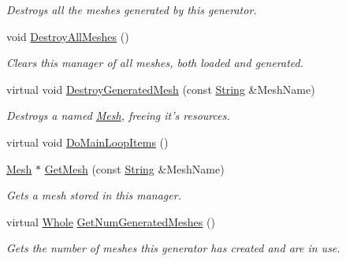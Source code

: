 \begin{DoxyCompactItemize}
\begin{DoxyCompactList}\small\item\em Destroys all the meshes generated by this generator. \item\end{DoxyCompactList}\item 
\hypertarget{classMezzanine_1_1MeshManager_aa807f17cbba66ff45f8ffd5d027dec7e}{
void \hyperlink{classMezzanine_1_1MeshManager_aa807f17cbba66ff45f8ffd5d027dec7e}{DestroyAllMeshes} ()}
\label{classMezzanine_1_1MeshManager_aa807f17cbba66ff45f8ffd5d027dec7e}

\begin{DoxyCompactList}\small\item\em Clears this manager of all meshes, both loaded and generated. \item\end{DoxyCompactList}\item 
virtual void \hyperlink{classMezzanine_1_1MeshManager_a9c9286c940e56c4ba6a02ef58bfc0374}{DestroyGeneratedMesh} (const \hyperlink{namespaceMezzanine_acf9fcc130e6ebf08e3d8491aebcf1c86}{String} \&MeshName)
\begin{DoxyCompactList}\small\item\em Destroys a named \hyperlink{classMezzanine_1_1Mesh}{Mesh}, freeing it's resources. \item\end{DoxyCompactList}\item 
virtual void \hyperlink{classMezzanine_1_1MeshManager_acfbea42e8aeb36d48522ad027f1e8764}{DoMainLoopItems} ()
\item 
\hyperlink{classMezzanine_1_1Mesh}{Mesh} $\ast$ \hyperlink{classMezzanine_1_1MeshManager_a9f564124032f9dc8a636f8092bbbc87e}{GetMesh} (const \hyperlink{namespaceMezzanine_acf9fcc130e6ebf08e3d8491aebcf1c86}{String} \&MeshName)
\begin{DoxyCompactList}\small\item\em Gets a mesh stored in this manager. \item\end{DoxyCompactList}\item 
virtual \hyperlink{namespaceMezzanine_adcbb6ce6d1eb4379d109e51171e2e493}{Whole} \hyperlink{classMezzanine_1_1MeshManager_a0b6d3fef8ecc0e12ff6de14618e788d8}{GetNumGeneratedMeshes} ()
\begin{DoxyCompactList}\small\item\em Gets the number of meshes this generator has created and are in use. \item\end{DoxyCompactList}\item 

\end{DoxyCompactItemize}
